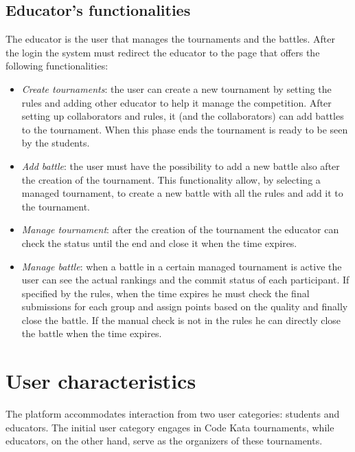 \documentclass[12pt, a4paper]{report}
\begin{document}
    \subsection{Educator's functionalities}
    The educator is the user that manages the tournaments and the battles. 
    After the login the system must redirect the educator to the page that offers the following functionalities: 
    \begin{itemize}
        \item \textit{Create tournaments}: the user can create a new tournament by setting the rules and adding other educator to help it manage the competition. 
            After setting up collaborators and rules, it (and the collaborators) can add battles to the tournament. 
            When this phase ends the tournament is ready to be seen by the students. 
        \item \textit{Add battle}: the user must have the possibility to add a new battle also after the creation of the tournament. 
            This functionality allow, by selecting a managed tournament, to create a new battle with all the rules and add it to the tournament. 
        \item \textit{Manage tournament}: after the creation of the tournament the educator can check the status until the end and close it when the time expires. 
        \item \textit{Manage battle}: when a battle in a certain managed tournament is active the user can see the actual rankings and the commit status of each participant. 
            If specified by the rules, when the time expires he must check the final submissions for each group and assign points based on the quality and finally close the battle. 
            If the manual check is not in the rules he can directly close the battle when the time expires. 
    \end{itemize}

    \section{User characteristics}
    The platform accommodates interaction from two user categories: students and educators. The initial user category engages in Code Kata tournaments, while educators, 
    on the other hand, serve as the organizers of these tournaments.
    
\end{document}
